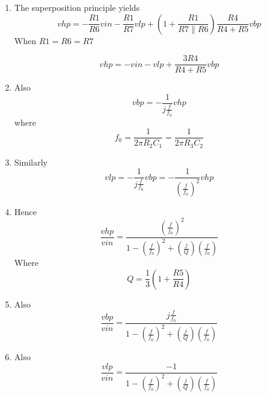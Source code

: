 \begin{enumerate}
\item The superposition principle yields
\begin{equation}
vhp = -\dfrac{R1}{R6}vin-\dfrac{R1}{R7}vlp+\left( 1+\dfrac{R1}{R7 \parallel R6} \right) \dfrac{R4}{R4+R5}vbp
\end{equation}
When $R1= R6 =R7$

\begin{equation}
vhp = -vin -vlp +  \dfrac{3R4}{R4+R5}vbp
\end{equation}

\item Also
\begin{equation}
vbp = -\dfrac{1}{j\frac{f}{f_{0}}}vhp
\end{equation}
where 
\begin{equation}
f_{0}=\dfrac{1}{2 \pi R_{2}C_{1}} = \dfrac{1}{2 \pi R_{3}C_{2}}
\end{equation} 

\item Similarly
\begin{equation}
vlp = -\dfrac{1}{j\frac{f}{f_{0}}}vbp = -\dfrac{1}{(\frac{f}{f_{0}})^{2}}vhp  
\end{equation}

\item Hence
\begin{equation}
\dfrac{vhp}{vin}=\dfrac{(\frac{f}{f_{0}})^{2}}{1-(\frac{f}{f_{0}})^{2}+(\frac{j}{Q})(\frac{f}{f_{0}})}
\end{equation}
Where
\begin{equation}
Q = \dfrac{1}{3}(1+\dfrac{R5}{R4})
\end{equation}

\item Also
\begin{equation}
\dfrac{vbp}{vin}=\dfrac{j\frac{f}{f_{0}}}{1-(\frac{f}{f_{0}})^{2}+(\frac{j}{Q})(\frac{f}{f_{0}})}
\end{equation}

\item Also
\begin{equation}
\dfrac{vlp}{vin}=\dfrac{-1}{1-(\frac{f}{f_{0}})^{2}+(\frac{j}{Q})(\frac{f}{f_{0}})}
\end{equation}

\end{enumerate}

